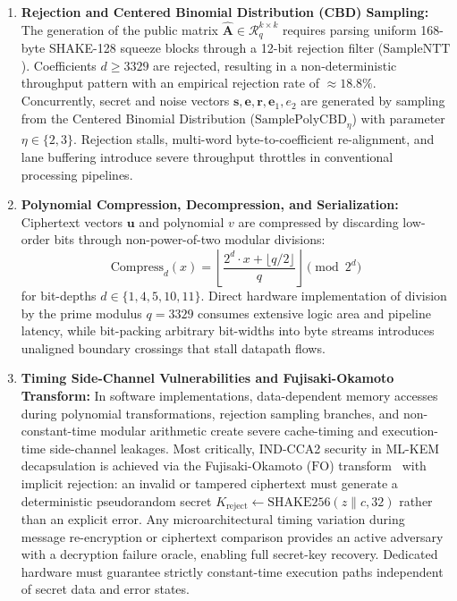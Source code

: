 \begin{enumerate}
    \item \textbf{Rejection and Centered Binomial Distribution (CBD) Sampling:}
    The generation of the public matrix $\hat{\mathbf{A}} \in \mathcal{R}_q^{k \times k}$ requires parsing uniform 168-byte SHAKE-128 squeeze blocks through a 12-bit rejection filter ($\text{SampleNTT}$). Coefficients $d \ge 3329$ are rejected, resulting in a non-deterministic throughput pattern with an empirical rejection rate of $\approx 18.8\%$. Concurrently, secret and noise vectors $\mathbf{s}, \mathbf{e}, \mathbf{r}, \mathbf{e}_1, e_2$ are generated by sampling from the Centered Binomial Distribution ($\text{SamplePolyCBD}_\eta$) with parameter $\eta \in \{2, 3\}$. Rejection stalls, multi-word byte-to-coefficient re-alignment, and lane buffering introduce severe throughput throttles in conventional processing pipelines.

    \item \textbf{Polynomial Compression, Decompression, and Serialization:}
    Ciphertext vectors $\mathbf{u}$ and polynomial $v$ are compressed by discarding low-order bits through non-power-of-two modular divisions:
    \begin{equation}
    \label{eq:intro_compress}
    \text{Compress}_d(x) = \left\lfloor \frac{2^d \cdot x + \lfloor q/2 \rfloor}{q} \right\rfloor \pmod{2^d}
    \end{equation}
    for bit-depths $d \in \{1, 4, 5, 10, 11\}$. Direct hardware implementation of division by the prime modulus $q = 3329$ consumes extensive logic area and pipeline latency, while bit-packing arbitrary bit-widths into byte streams introduces unaligned boundary crossings that stall datapath flows.

    \item \textbf{Timing Side-Channel Vulnerabilities and Fujisaki-Okamoto Transform:}
    In software implementations, data-dependent memory accesses during polynomial transformations, rejection sampling branches, and non-constant-time modular arithmetic create severe cache-timing and execution-time side-channel leakages. Most critically, IND-CCA2 security in ML-KEM decapsulation is achieved via the Fujisaki-Okamoto ($\text{FO}$) transform~\cite{fo1999} with implicit rejection: an invalid or tampered ciphertext must generate a deterministic pseudorandom secret $K_{\text{reject}} \leftarrow \text{SHAKE256}(z \parallel c, 32)$ rather than an explicit error. Any microarchitectural timing variation during message re-encryption or ciphertext comparison provides an active adversary with a decryption failure oracle, enabling full secret-key recovery. Dedicated hardware must guarantee strictly constant-time execution paths independent of secret data and error states.
\end{enumerate}

